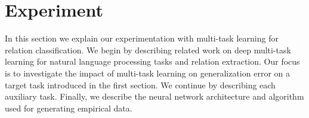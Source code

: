 \chapter{Experiment}
In this section we explain our experimentation with multi-task learning for relation classification. We begin by describing related work on deep multi-task learning for natural language processing tasks and relation extraction. Our focus is to investigate the impact of multi-task learning on generalization error on a target task introduced in the first section. We continue by describing each auxiliary task. Finally, we describe the neural network architecture and algorithm used for generating empirical data.




